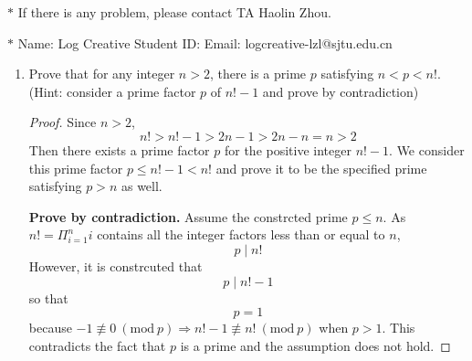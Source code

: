 \documentclass[12pt,a4paper]{article}
\theoremstyle{definition}
\begin{document}
\noindent

\noindent{}
\begin{center}
\footnotesize{\color{red}$*$ If there is any problem, please contact TA Haolin Zhou.}

\footnotesize{\color{blue}$*$ Name: Log Creative  \quad Student ID:  \quad Email: logcreative-lzl@sjtu.edu.cn}
\end{center}

\begin{enumerate}
    \item
    Prove that for any integer $n>2$, there is a prime $p$ satisfying $n<p<n!$. {\color{blue}(Hint: consider a prime factor $p$ of $n!-1$ and prove by contradiction)}
   \begin{proof}


        Since $n>2$,
        \begin{equation*}
            n!>n!-1>2n-1>2n-n=n>2
        \end{equation*}
        Then there exists a prime factor $p$ for the positive integer $n!-1$. We consider this prime factor $p\leq n!-1<n!$ and prove it to be the specified prime satisfying $p>n$ as well.

        \textbf{Prove by contradiction.} Assume the constrcted prime $p\leq n$. As $n!=\Pi_{i=1}^n i$ contains all the integer factors less than or equal to $n$, 
        \begin{equation*}
            p\mid n!
        \end{equation*}
        However, it is constrcuted that
        \begin{equation*}
            p\mid n!-1
        \end{equation*}
        so that
        \begin{equation*}
            p=1
        \end{equation*}
        because $-1\not\equiv 0~(\text{mod}~p)\Rightarrow n!-1\not\equiv n!~(\text{mod}~p)$ when $p>1$. This contradicts the fact that $p$ is a prime and the assumption does not hold.


\end{proof}
\end{enumerate}
\end{document}
